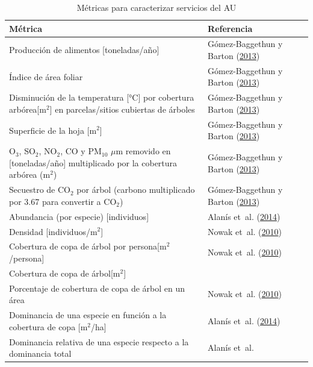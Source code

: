 \documentclass[12pt,a4paper,oneside, openany]{book}
\theoremstyle{definition}
\theoremstyle{definition}
\theoremstyle{definition}
\theoremstyle{remark}
\begin{document}
\begin{table}[t]

\caption{\label{tab:ind-AU}Métricas para caracterizar servicios del AU}
\centering
\fontsize{11}{13}\selectfont
\begin{tabular}{>{\raggedleft\arraybackslash}p{8cm}>{\raggedleft\arraybackslash}p{6cm}rr}
\toprule
Métrica & Referencia\\
\midrule
Producción de alimentos [toneladas/año] & Gómez-Baggethun y Barton
(\protect\hyperlink{ref-gomez-baggethun_classifying_2013}{2013})\\
Índice de área foliar & Gómez-Baggethun y Barton
(\protect\hyperlink{ref-gomez-baggethun_classifying_2013}{2013})\\
Disminución de la temperatura [°C] por cobertura arbórea[m$^2$] en parcelas/sitios cubiertas de árboles & Gómez-Baggethun y Barton
(\protect\hyperlink{ref-gomez-baggethun_classifying_2013}{2013})\\
Superficie de la hoja [m$^2$] & Gómez-Baggethun y Barton
(\protect\hyperlink{ref-gomez-baggethun_classifying_2013}{2013})\\
O$_3$, SO$_2$, NO$_2$, CO y PM$_{10}$ $\mu$m removido en [toneladas/año] multiplicado por la cobertura arbórea (m$^2$) & Gómez-Baggethun y Barton
(\protect\hyperlink{ref-gomez-baggethun_classifying_2013}{2013})\\
\addlinespace
Secuestro de CO$_2$ por árbol (carbono multiplicado por 3.67 para convertir a CO$_2$) & Gómez-Baggethun y Barton
(\protect\hyperlink{ref-gomez-baggethun_classifying_2013}{2013})\\
Abundancia (por especie) [individuos] & Alanís et~al.
(\protect\hyperlink{ref-alanis_estructura_2014}{2014})\\
Densidad [individuos/m$^2$] & Nowak et~al.
(\protect\hyperlink{ref-nowak_sustaining_2010}{2010})\\
Cobertura de copa de árbol por persona[m$^2$/persona] & Nowak et~al.
(\protect\hyperlink{ref-nowak_sustaining_2010}{2010})\\
Cobertura de copa de árbol[m$^2$] & \\
\addlinespace
Porcentaje de cobertura de copa de árbol en un área & Nowak et~al.
(\protect\hyperlink{ref-nowak_sustaining_2010}{2010})\\
Dominancia de una especie en función a la cobertura de copa [m$^2$/ha] & Alanís et~al.
(\protect\hyperlink{ref-alanis_estructura_2014}{2014})\\
Dominancia relativa de una especie respecto a la dominancia total & Alanís et~al.

\end{tabular}
\end{table}
\end{document}
